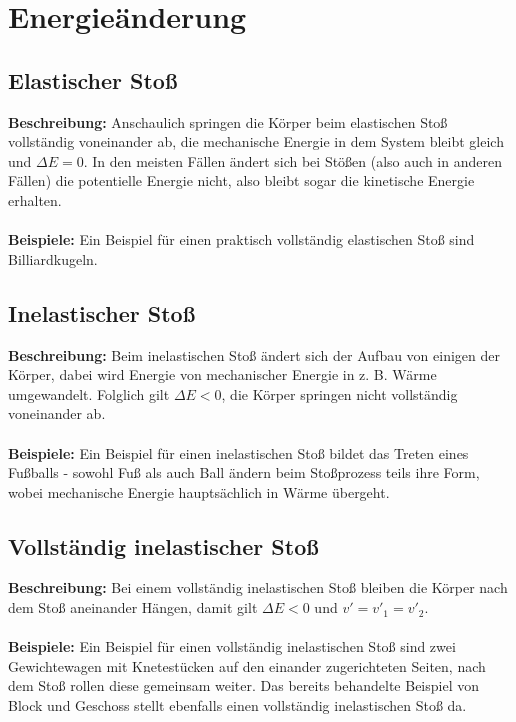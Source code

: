 \documentclass[11pt]{article}
\begin{document}
\section{Energieänderung}
\subsection{Elastischer Stoß}
\textbf{Beschreibung:} Anschaulich springen die Körper beim elastischen Stoß vollständig voneinander ab, die mechanische Energie in dem System bleibt gleich und $\Delta E = 0$. In den meisten Fällen ändert sich bei Stößen (also auch in anderen Fällen) die potentielle Energie nicht, also bleibt sogar die kinetische Energie erhalten. \\\\
\textbf{Beispiele:} Ein Beispiel für einen praktisch vollständig elastischen Stoß sind Billiardkugeln. 


\subsection{Inelastischer Stoß}
\textbf{Beschreibung:} Beim inelastischen Stoß ändert sich der Aufbau von einigen der Körper, dabei wird Energie von mechanischer Energie in z. B. Wärme umgewandelt. Folglich gilt $\Delta E < 0$, die Körper springen nicht vollständig voneinander ab. \\\\
\textbf{Beispiele:} Ein Beispiel für einen inelastischen Stoß bildet das Treten eines Fußballs - sowohl Fuß als auch Ball ändern beim Stoßprozess teils ihre Form, wobei mechanische Energie hauptsächlich in Wärme übergeht. 

\subsection{Vollständig inelastischer Stoß}
\textbf{Beschreibung:} Bei einem vollständig inelastischen Stoß bleiben die Körper nach dem Stoß aneinander Hängen, damit gilt $\Delta E < 0$ und $v' = v'_1 = v'_2$. \\\\
\textbf{Beispiele:} Ein Beispiel für einen vollständig inelastischen Stoß sind zwei Gewichtewagen mit Knetestücken auf den einander zugerichteten Seiten, nach dem Stoß rollen diese gemeinsam weiter. Das bereits behandelte Beispiel von Block und Geschoss stellt ebenfalls einen vollständig inelastischen Stoß da. 
\end{document}
